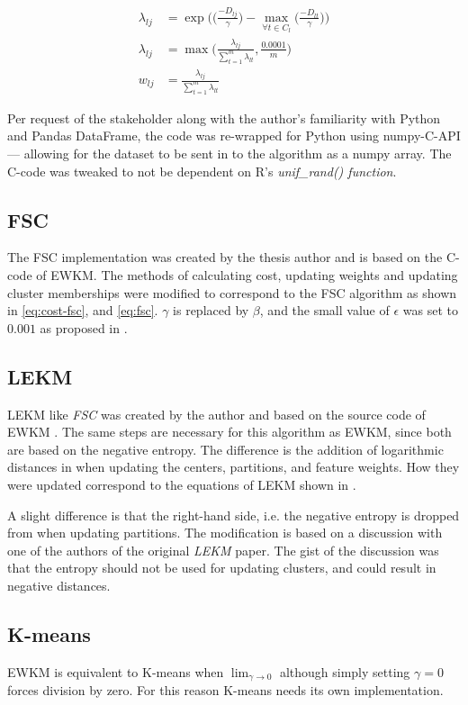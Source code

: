 \documentclass[../report.tex]{subfiles}
\begin{document}
\begin{align}
  \lambda_{lj} &= \exp\bigg({\Big(\frac{-D_{lj}}{\gamma}\Big) - \max_{\forall{t} \in C_l}\Big({\frac{-D_{lt}}{\gamma}}\Big)}\bigg) \\
  \lambda_{lj} &= \max\bigg(\frac{\lambda_{lj}}{\sum_{t=1}^{m}{\lambda_{lt}}}, \frac{0.0001}{m}\bigg)\\
  \label{eq:newlambda}
  w_{lj} &= \frac{\lambda_{lj}}{\sum^{m}_{t=1}{\lambda_{ lt }}}
\end{align}

Per request of the stakeholder along with the author's familiarity with Python and Pandas DataFrame, the code was re-wrapped for Python using numpy-C-API \cite{numpy-c} --- allowing for the dataset to be sent in to the algorithm as a numpy array. The C-code was tweaked to not be dependent on R's \textit{unif\_rand() function}.

\subsection{FSC}
The FSC implementation was created by the thesis author and is based on the C-code of EWKM. The methods of calculating cost, updating weights and updating cluster memberships were modified to correspond to the FSC algorithm as shown in \cref{eq:cost-fsc}, and \cref{eq:fsc}. $\gamma$ is replaced by $\beta$, and the small value of $\epsilon$ was set to $0.001$ as proposed in \cite{Gan2006}.

\subsection{LEKM}
LEKM like \textit{FSC} was created by the author and based on the source code of EWKM \cite{wskm2014hz}. The same steps are necessary for this algorithm as EWKM, since both are based on the negative entropy. The difference is the addition of logarithmic distances in when updating the centers, partitions, and feature weights. How they were updated correspond to the equations of LEKM shown in .

A slight difference is that the right-hand side, i.e. the negative entropy is dropped from when updating partitions. The modification is based on a discussion with one of the authors of the original \textit{LEKM} paper. The gist of the discussion was that the entropy should not be used for updating clusters, and could result in negative distances.

\subsection{K-means}
EWKM is equivalent to K-means when $\lim_{\gamma \to 0}$ although simply setting $\gamma = 0$ forces division by zero. For this reason K-means needs its own implementation.
\end{document}
